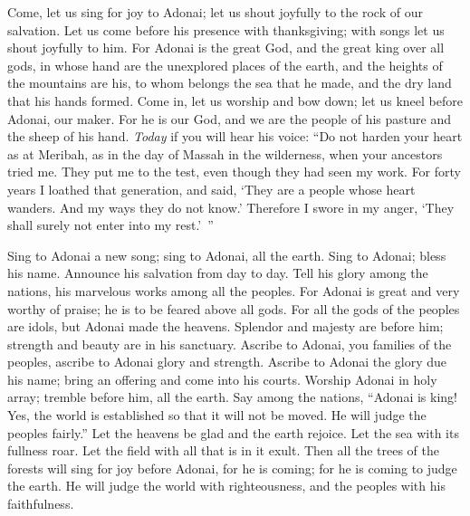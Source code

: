 \begin{biblechapter} %
 Come, let us sing for joy to Adonai; 
let us shout joyfully to the rock of our salvation.
\verse Let us come before his presence with thanksgiving; 
with songs let us shout joyfully to him.
\verse For Adonai is the great God, 
and the great king over all gods,
\verse in whose hand are the unexplored places of the earth, 
and the heights of the mountains are his,
\verse to whom belongs the sea that he made,  
and the dry land that his hands formed.
\verse Come in, let us worship and bow down; 
let us kneel before Adonai, our maker.
\verse For he is our God, 
and we are the people of his pasture 
and the sheep of his hand. 
\textit{Today} if you will hear his voice:
\verse “Do not harden your heart as at Meribah, 
as in the day of Massah in the wilderness,
\verse when your ancestors tried me. 
They put me to the test, 
even though they had seen my work.
\verse For forty years I loathed that generation, 
and said, ‘They are a people whose heart wanders. 
And my ways they do not know.’
\verse Therefore I swore in my anger, 
‘They shall surely not enter into my rest.’ ”
\end{biblechapter}

\begin{biblechapter} %
 Sing to Adonai a new song; 
sing to Adonai, all the earth.
\verse Sing to Adonai; bless his name. 
Announce his salvation from day to day.
\verse Tell his glory among the nations, 
his marvelous works among all the peoples.
\verse For Adonai is great and very worthy of praise; 
he is to be feared above all gods.
\verse For all the gods of the peoples are idols, 
but Adonai made the heavens.
\verse Splendor and majesty are before him; 
strength and beauty are in his sanctuary.
\verse Ascribe to Adonai, you families of the peoples, 
ascribe to Adonai glory and strength.
\verse Ascribe to Adonai the glory due his name; 
bring an offering and come into his courts.
\verse Worship Adonai in holy array; 
tremble before him, all the earth.
\verse Say among the nations, “Adonai is king! 
Yes, the world is established so that it will not be moved. 
He will judge the peoples fairly.”
\verse Let the heavens be glad and the earth rejoice. 
Let the sea with its fullness roar.
\verse Let the field with all that is in it exult. 
Then all the trees of the forests will sing for joy
\verse before Adonai, for he is coming; 
for he is coming to judge the earth. 
He will judge the world with righteousness, 
and the peoples with his faithfulness.
\end{biblechapter}

